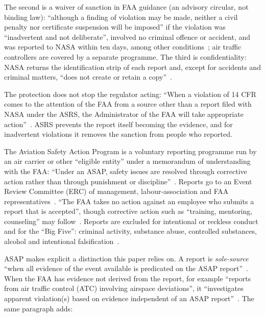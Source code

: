 \documentclass[review,12pt]{elsarticle}
\makeatletter
\renewcommand\paragraph{\@startsection{paragraph}{4}{\z@}{1.5ex \@plus .5ex \@minus .2ex}{-1em}{\normalfont\normalsize\bfseries}}
\makeatother
\begin{document}
The second is a waiver of sanction in FAA guidance (an advisory circular, not binding law): ``although a finding of violation may be made, neither a civil penalty nor certificate suspension will be imposed'' if the violation was ``inadvertent and not deliberate'', involved no criminal offence or accident, and was reported to NASA within ten days, among other conditions~\cite[para.~12.3]{faa2021}; air traffic controllers are covered by a separate programme. The third is confidentiality: NASA returns the identification strip of each report and, except for accidents and criminal matters, ``does not create or retain a copy''~\cite[para.~10.2]{faa2021}.

The protection does not stop the regulator acting: ``When a violation of 14 CFR comes to the attention of the FAA from a source other than a report filed with NASA under the ASRS, the Administrator of the FAA will take appropriate action''~\cite[para.~8.3]{faa2021}. ASRS prevents the report itself becoming the evidence, and for inadvertent violations it removes the sanction from people who reported.

\paragraph{ASAP.} The Aviation Safety Action Program is a voluntary reporting programme run by an air carrier or other ``eligible entity'' under a memorandum of understanding with the FAA: ``Under an ASAP, safety issues are resolved through corrective action rather than through punishment or discipline''~\cite[para.~1]{faa2020}. Reports go to an Event Review Committee (ERC) of management, labour-association and FAA representatives~\cite[para.~A.8]{faa2020}. ``The FAA takes no action against an employee who submits a report that is accepted'', though corrective action such as ``training, mentoring, counseling'' may follow~\cite[paras.~15, 16.1]{faa2020}. Reports are excluded for intentional or reckless conduct and for the ``Big Five'': criminal activity, substance abuse, controlled substances, alcohol and intentional falsification~\cite[paras.~18.2--18.4, A.4]{faa2020}.

ASAP makes explicit a distinction this paper relies on. A report is \emph{sole-source} ``when all evidence of the event available is predicated on the ASAP report''~\cite[para.~A.20]{faa2020}. When the FAA has evidence not derived from the report, for example ``reports from air traffic control (ATC) involving airspace deviations'', it ``investigates apparent violation(s) based on evidence independent of an ASAP report''~\cite[para.~16.4]{faa2020}. The same paragraph adds:
\end{document}
